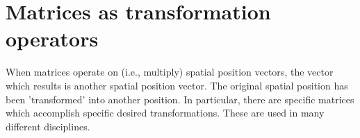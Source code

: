 \begin{sol}
\begin{enumerate}



\end{enumerate}
\end{sol}

\section{Matrices as transformation operators}

When matrices operate on (i.e., multiply) spatial position vectors, the vector which results is another spatial position vector.  The original spatial position has been 'transformed' into another position.  In particular, there are specific matrices which accomplish specific desired transformations. These are used in many different disciplines.

